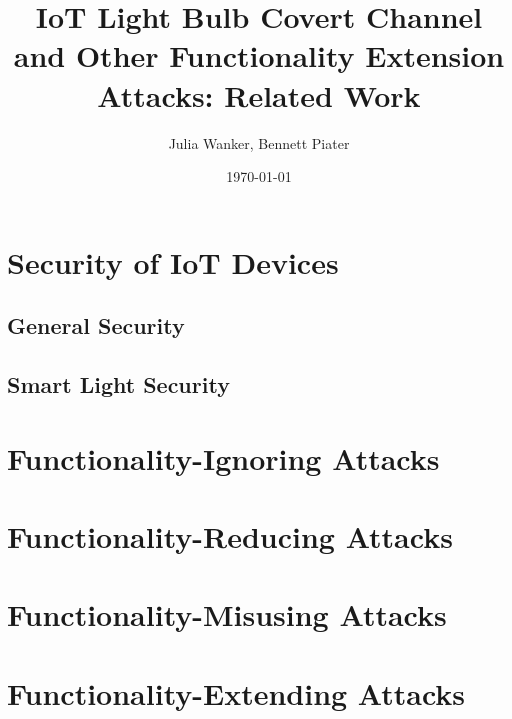 \documentclass[11pt,a4paper]{article}
\begin{document}
	\title{IoT Light Bulb Covert Channel and Other Functionality Extension Attacks: Related Work}
	\author{Julia Wanker, Bennett Piater}
	\date{\today}
	\maketitle

	\section{Security of IoT Devices}%
	\label{sec:security_of_iot_devices}

	\subsection{General Security}%
	\label{sub:general_security}

	\cite{Grau:2015:Ctyf} %
	\cite{Bhartiya::YSFMK} %
	\cite{Restuccia:2018:SITNPaRC} %
  \cite{Zhang:2017:UISTDCBWWNaWWG} %

	\subsection{Smart Light Security}%
	\label{sub:smart_light_security}
	\cite{Dhanjani:2013:HLSEPHPWLS} %
	\cite{Morgner:2016:AYBBUICSSCLS} %
	\cite{Ronen:2018:IGNCZCR} %

	\section{Functionality-Ignoring Attacks}%
	\label{sec:functionality_ignoring_attacks}
	\cite{Angrishi:2017:TitiiiviIb} %
	\cite{Antonakakis:2017:UMB} %
	\cite{Kolias:2017:DIMaOB} %
	\cite{Spognardi:2017:ADIM} %

	\section{Functionality-Reducing Attacks}%
	\label{sec:functionality_reducing_attacks}


	\section{Functionality-Misusing Attacks}%
	\label{sec:functionality_misusing_attacks}

	\section{Functionality-Extending Attacks}%
	\label{sec:functionality_extending_attacks}



	
	
\end{document}
